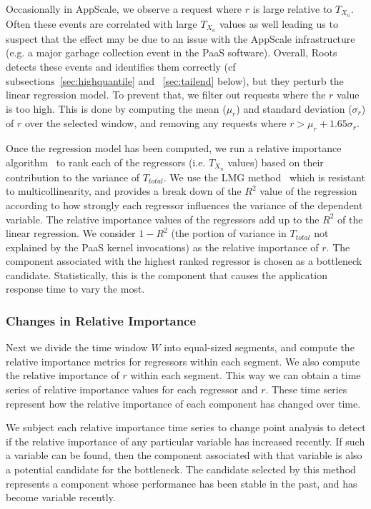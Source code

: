 Occasionally in AppScale, we observe a request where $r$ is
large relative to $T_{X_n}$.  Often these events are correlated with large
$T_{X_n}$ values as well leading us to suspect that the effect may be due to
an issue with the AppScale infrastructure (e.g. a major garbage collection
event in the PaaS software).  Overall, Roots detects these events and identifies them correctly (cf
subsections~\ref{sec:highquantile} and ~\ref{sec:tailend} below), but they
perturb the linear regression model.  To prevent that,
we filter out requests where the $r$ value is too high. This
is done by computing the mean ($\mu_r$) and standard deviation ($\sigma_r$) of $r$ 
over the selected window, and removing 
any requests where $r > \mu_r + 1.65\sigma_r$.

Once the regression model has been computed, we run a relative importance algorithm~\cite{JSSv017i01} to rank each of the
regressors (i.e. $T_{X_n}$ values) based on their contribution to the variance of $T_{total}$. 
We use the LMG method~\cite{lmg80} which is resistant to multicollinearity, and provides a break down of the $R^2$ value of
the regression according to how strongly each regressor influences the variance of the dependent variable.
The relative importance values of the regressors add up to the $R^2$ of the linear regression. We consider
$1 - R^2$ (the portion of variance in $T_{total}$ not explained by the PaaS kernel invocations) as the relative importance of $r$. 
The component associated with the highest ranked regressor is chosen as a bottleneck candidate.
Statistically, this is the component that causes the application response time to vary the most.

\subsubsection{Changes in Relative Importance}
Next we divide the time window $W$ into equal-sized segments,
and compute the relative importance metrics for regressors within each segment. We also compute the
relative importance of $r$ within each segment. This way we can
obtain a time series of relative importance values for each regressor and $r$. These time series
represent how the relative importance of each component has changed over time.

We subject each relative importance time series to change point analysis to detect if the relative importance of any particular
variable has increased recently. If such a variable can be found, then the component
associated with that variable is also a potential candidate for the bottleneck. 
The candidate selected by this method represents
a component whose performance has been stable in the past, and has become variable recently. 

